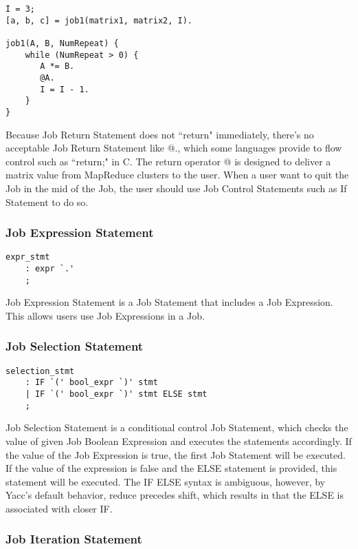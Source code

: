 \documentclass[prodmode,acmtecs]{acmsmall}
\begin{document}
\begin{lstlisting}
I = 3;
[a, b, c] = job1(matrix1, matrix2, I).

job1(A, B, NumRepeat) {
    while (NumRepeat > 0) {
       A *= B.
       @A.
       I = I - 1. 
    }
}
\end{lstlisting}

Because Job Return Statement does not ``return" immediately,
there's no acceptable Job Return Statement like $@.$, which some
languages provide to flow control such as ``return;" in C.  The
return operator $@$ is designed to deliver a matrix value from
MapReduce clusters to the user.  When a user want to quit the Job
in the mid of the Job, the user should use Job Control Statements
such as If Statement to do so.
\medskip


\subsubsection{Job Expression Statement}

\begin{lstlisting}
expr_stmt
	: expr `.'
	;
\end{lstlisting}

Job Expression Statement is a Job Statement that includes a Job
Expression.  This allows users use Job Expressions in a Job.
\medskip

\subsubsection{Job Selection Statement}

\begin{lstlisting}
selection_stmt
	: IF `(' bool_expr `)' stmt
	| IF `(' bool_expr `)' stmt ELSE stmt
	;
\end{lstlisting}

Job Selection Statement is a conditional control Job Statement,
which checks the value of given Job Boolean Expression and executes
the statements accordingly.  If the value of the Job Expression is
true, the first Job Statement will be executed.  If the value of
the expression is false and the ELSE statement is provided, this
statement will be executed.  The IF ELSE syntax is ambiguous,
however, by Yacc's default behavior, reduce precedes shift, which
results in that the ELSE is associated with closer IF.
\medskip

\subsubsection{Job Iteration Statement}
\end{document}
